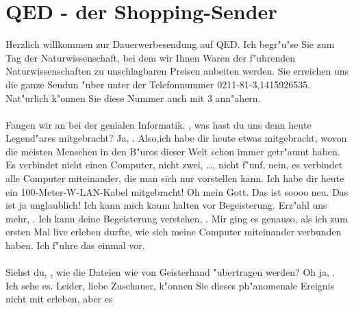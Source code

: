 %
%
\newpage
\section{QED - der Shopping-Sender}
\label{sec:QED}
        \charaktere{\QEDHost, \QEDGuestA, \QEDGuestB \QEDGuestC}
        \hauptbeamer{}
        \sound{}
        \licht{}
\begin{verseplay}[5em]
\s{\QEDHost} Herzlich willkommen zur Dauerwerbesendung auf QED. Ich begr"u"se 
                Sie zum Tag der Naturwissenschaft, bei dem wir Ihnen Waren der
                f"uhrenden Naturwissenschaften zu unschlagbaren Preisen anbeiten 
                werden. Sie erreichen uns die ganze Sendun "uber unter der 
                Telefonnummer 0211-81-3,1415926535. Nat"urlich k"onnen Sie diese 
                Nummer auch mit 3 ann"ahern.\\
                \\
                Fangen wir an bei der genialen Informatik. \QEDGuestA, was hast
                du uns denn heute Legend"ares mitgebracht?
\s{\QEDGuestA} Ja, \QEDHost. Also,ich habe dir heute etwas mitgebracht, 
                wovon die meisten Menschen in den B"uros dieser Welt schon immer 
                getr"aumt haben. Es verbindet nicht einen Computer, nicht zwei, 
                \dots, nicht f"unf, nein, es verbindet alle Computer miteinander, 
                die man sich nur vorstellen kann. Ich habe dir heute ein 
                100-Meter-W-LAN-Kabel mitgebracht!
\s{\QEDHost} Oh mein Gott. Das ist soooo neu. Das ist ja unglaublich! Ich 
                kann mich kaum halten vor Begeisterung. Erz"ahl uns mehr, \QEDGuestA.
\s{\QEDGuestA} Ich kann deine Begeisterung verstehen, \QEDHost. Mir ging es 
                genauso, als ich zum ersten Mal live erleben durfte, wie sich 
                meine Computer miteinander verbunden haben. Ich f"uhre das einmal 
                vor.\\
                \\
                Siehst du, \QEDHost, wie die Dateien wie von Geisterhand 
                "ubertragen werden?
\s{\QEDHost} Oh ja, \QEDGuestA. Ich sehe es. Leider, liebe Zuschauer, 
                k"onnen Sie dieses ph"anomenale Ereignis nicht mit erleben, aber es 

\end{verseplay}
